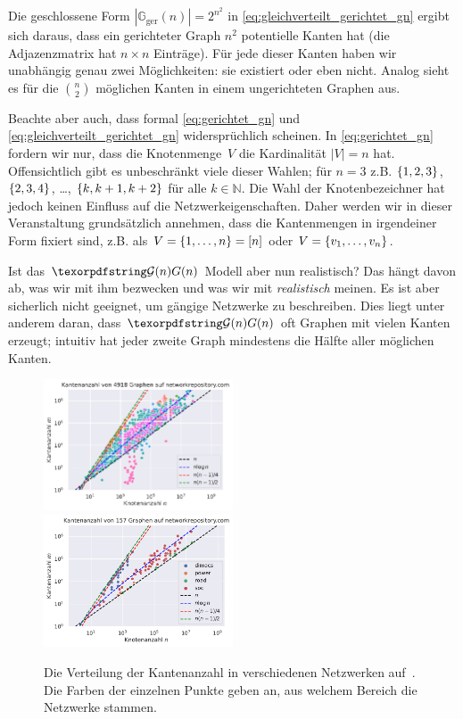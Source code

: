 Die geschlossene Form $| \mathbb G_\text{ger}(n) | = 2^{n^2}$ in \cref{eq:gleichverteilt_gerichtet_gn} ergibt sich daraus, dass ein gerichteter Graph $n^2$ potentielle Kanten hat (die Adjazenzmatrix hat $n \times n$ Einträge).
Für jede dieser Kanten haben wir unabhängig genau zwei Möglichkeiten: sie existiert oder eben nicht.
Analog sieht es für die $\binom n 2$ möglichen Kanten in einem ungerichteten Graphen aus.

Beachte aber auch, dass formal \cref{eq:gerichtet_gn} und \cref{eq:gleichverteilt_gerichtet_gn} widersprüchlich scheinen.
In \cref{eq:gerichtet_gn} fordern wir nur, dass die Knotenmenge~$V$ die Kardinalität $|V| = n$ hat.
Offensichtlich gibt es unbeschränkt viele dieser Wahlen; für $n=3$ z.B. $\left\{1,2,3\right\}$, $\left\{2,3,4\right\}$, \ldots, $\left\{k, k+1, k+2\right\}$ für alle $k \in \mathbb N$.
Die Wahl der Knotenbezeichner hat jedoch keinen Einfluss auf die Netzwerkeigenschaften.
Daher werden wir in dieser Veranstaltung grundsätzlich annehmen, dass die Kantenmengen in irgendeiner Form fixiert sind, z.B. als $V = \left\{1, \ldots, n\right\} = [n]$ oder $V = \left\{v_1, \ldots, v_n\right\}$.

\bigskip

Ist das $\Gn$ Modell aber nun realistisch?
Das hängt davon ab, was wir mit ihm bezwecken und was wir mit \emph{realistisch} meinen.
Es ist aber sicherlich nicht geeignet, um gängige Netzwerke zu beschreiben.
Dies liegt unter anderem daran, dass $\Gn$ oft Graphen mit vielen Kanten erzeugt;
intuitiv hat \glqq jeder zweite Graph\grqq{} mindestens die Hälfte aller möglichen Kanten.

\begin{figure}[t]
    \begin{center}
        \includegraphics[width=0.5\textwidth]{data/network-rep-edges.pdf}%
        \includegraphics[width=0.5\textwidth]{data/network-rep-edges-thin.pdf}%
    \end{center}
    \caption{
        Die Verteilung der Kantenanzahl in verschiedenen Netzwerken auf~\cite{networkrepository}.
        Die Farben der einzelnen Punkte geben an, aus welchem Bereich die Netzwerke stammen.
    }
    \label{fig:kantenanzahl}
\end{figure}


